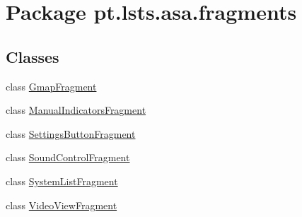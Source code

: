 \hypertarget{namespacept_1_1lsts_1_1asa_1_1fragments}{}\section{Package pt.\+lsts.\+asa.\+fragments}
\label{namespacept_1_1lsts_1_1asa_1_1fragments}
\subsection*{Classes}
\begin{DoxyCompactItemize}
\item 
class \hyperlink{classpt_1_1lsts_1_1asa_1_1fragments_1_1GmapFragment}{Gmap\+Fragment}
\item 
class \hyperlink{classpt_1_1lsts_1_1asa_1_1fragments_1_1ManualIndicatorsFragment}{Manual\+Indicators\+Fragment}
\item 
class \hyperlink{classpt_1_1lsts_1_1asa_1_1fragments_1_1SettingsButtonFragment}{Settings\+Button\+Fragment}
\item 
class \hyperlink{classpt_1_1lsts_1_1asa_1_1fragments_1_1SoundControlFragment}{Sound\+Control\+Fragment}
\item 
class \hyperlink{classpt_1_1lsts_1_1asa_1_1fragments_1_1SystemListFragment}{System\+List\+Fragment}
\item 
class \hyperlink{classpt_1_1lsts_1_1asa_1_1fragments_1_1VideoViewFragment}{Video\+View\+Fragment}
\end{DoxyCompactItemize}
